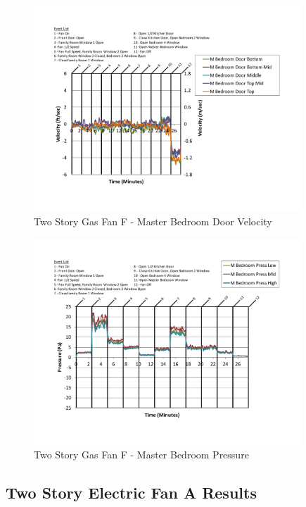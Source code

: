 \documentclass{article}
\begin{document}
\begin{appendices}
	\begin{figure}[H]
		\centering
		\includegraphics[height=3.05in,trim=0.67in 1.1in 0.67in 0.8in,clip=true]{0_Images/Results_Charts/ColdFlow/Two_Story/Gas/F/Master_Bedroom_Door_Velocity.pdf}
		\caption{Two Story Gas Fan F - Master Bedroom Door Velocity}
	\end{figure}
 

	\begin{figure}[H]
		\centering
		\includegraphics[height=3.05in,trim=0.67in 1.1in 0.67in 0.8in,clip=true]{0_Images/Results_Charts/ColdFlow/Two_Story/Gas/F/Master_Bedroom_Pressure.pdf}
		\caption{Two Story Gas Fan F - Master Bedroom Pressure}
	\end{figure}
 
	\clearpage

		\clearpage
\clearpage		\large
\subsection{Two Story Electric Fan A Results} \label{App:Two_StoryElectricFanAResults} 


\end{appendices}
\end{document}
